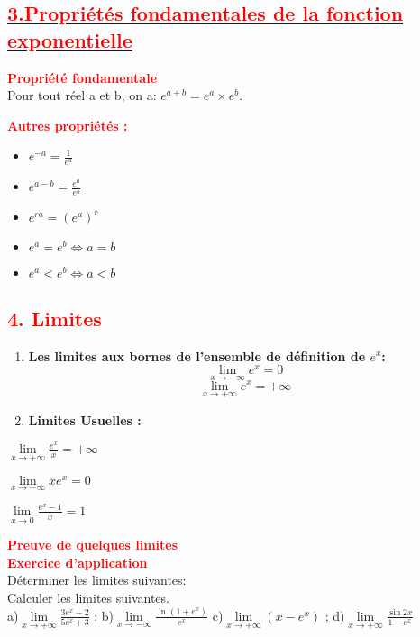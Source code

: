 \documentclass[12pt]{article}
\begin{document}
\subsection*{\underline{\textbf{\textcolor{red}{3.Propriétés fondamentales de la fonction exponentielle}}}}
\textbf{\textcolor{red}{Propriété fondamentale}}\\

Pour tout réel a et b, on a: $e^{a+b}=e^{a} \times e^{b}$.

\textbf{\textcolor{red}{ Autres propriétés :}}\\
\begin{itemize}
    \item \textbf{} \(e^{-a}=\frac{1}{e^{a}}\)
    \item \textbf{} \(e^{a-b}=\frac{e^{a}}{e^{b}}\)
    \item \textbf{} \(e^{ra}=(e^{a})^{r}\)
    \item \textbf{} \(e^{a}=e^{b} \Leftrightarrow a=b\)
    \item \textbf{} \(e^{a}<e^{b} \Leftrightarrow a<b\)
\end{itemize}

\subsection*{\textbf{\textcolor{red}{4. Limites }}}

\begin{enumerate}[label=(\alph*)]
    \item \textbf{Les limites aux bornes de l'ensemble de définition de \( e^x \):}
    \[
    \lim_{x \to -\infty} e^x = 0
    \]
    \[
    \lim_{x \to +\infty} e^x = +\infty
    \]

    \item \textbf{Limites Usuelles :}

\end{enumerate}

\(
\lim\limits_{x \to +\infty} \frac{e^x}{x} = +\infty
\)

$\lim\limits_{x \to -\infty}xe^{x}=0$

$\lim\limits_{x \to 0}\frac{e^{x}-1}{x}=1$

\underline{\textbf{\textcolor{red}{Preuve de quelques limites}}}\\

\underline{\textbf{\textcolor{red}{Exercice d'application}}}\\
Déterminer les limites suivantes:\\
Calculer les limites suivantes.\\
a)\( \lim\limits_{x \to +\infty}\frac{3e^{x}-2}{5e^{x}+3}\) ; b)\(\lim\limits_{x \to -\infty}\frac{\ln(1+e^{x})}{e^{x}}\)
c)\( \lim\limits_{x \to +\infty}(x-e^{x})\) ; d)\( \lim\limits_{x \to +\infty}\frac{\sin2x}{1-e^{x}}\)
\end{document}
